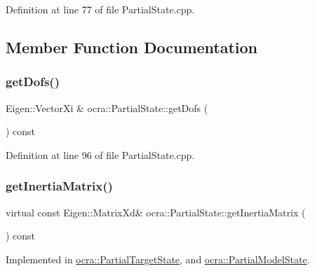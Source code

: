 Definition at line 77 of file Partial\+State.\+cpp.



\subsection{Member Function Documentation}
\hypertarget{classocra_1_1PartialState_a969bb0d941f73df7da78aba4339908c4}{}\label{classocra_1_1PartialState_a969bb0d941f73df7da78aba4339908c4} 
\subsubsection{\texorpdfstring{get\+Dofs()}{getDofs()}}
{\footnotesize\ttfamily Eigen\+::\+Vector\+Xi \& ocra\+::\+Partial\+State\+::get\+Dofs (\begin{DoxyParamCaption}{ }\end{DoxyParamCaption}) const\hspace{0.3cm}{\ttfamily [protected]}}



Definition at line 96 of file Partial\+State.\+cpp.

\hypertarget{classocra_1_1PartialState_ad811a25932f0fad439242ebd48841162}{}\label{classocra_1_1PartialState_ad811a25932f0fad439242ebd48841162} 
\subsubsection{\texorpdfstring{get\+Inertia\+Matrix()}{getInertiaMatrix()}}
{\footnotesize\ttfamily virtual const Eigen\+::\+Matrix\+Xd\& ocra\+::\+Partial\+State\+::get\+Inertia\+Matrix (\begin{DoxyParamCaption}{ }\end{DoxyParamCaption}) const\hspace{0.3cm}{\ttfamily [pure virtual]}}



Implemented in \hyperlink{classocra_1_1PartialTargetState_a757cd49fca47e934025e92b81dc15535}{ocra\+::\+Partial\+Target\+State}, and \hyperlink{classocra_1_1PartialModelState_a9fe03ab8c3c4afe56ee4b59f96ac4a25}{ocra\+::\+Partial\+Model\+State}.

